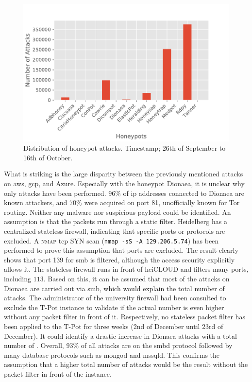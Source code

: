\begin{figure}
    \centering
    \includegraphics[width=\textwidth]{figures/tpot-overview-attacks.pdf}
    \caption[Distribution of honeypot attacks]{
        Distribution of honeypot attacks.
        Timestamp; 26th of September to 16th of October.
    }
    \label{fig:overview-attacks}
\end{figure}

What is striking is the large disparity between the previously mentioned attacks on \ac{aws}, \ac{gcp}, and Azure.
Especially with the honeypot Dionaea, it is unclear why only  attacks have been performed.
$96\%$ of \ac{ip} addresses connected to Dionaea are known attackers, and $70\%$ were acquired on port 81, unofficially known for Tor routing.
Neither any malware nor suspicious payload could be identified.
An assumption is that the packets run through a static filter.
Heidelberg has a centralized stateless firewall, indicating that specific ports or protocols are excluded.
A \textsc{nmap} \ac{tcp} SYN scan (\verb|nmap -sS -A 129.206.5.74|) has been performed to prove this assumption that ports are excluded.
The result clearly shows that port 139 for \ac{smb} is filtered, although the access security explicitly allows it.
The stateless firewall runs in front of heiCLOUD and filters many ports, including $113$.
Based on this, it can be assumed that most of the attacks on Dionaea are carried out via \ac{smb}, which would explain the total number of attacks.
The administrator of the university firewall had been consulted to exclude the T-Pot instance to validate if the actual number is even higher without any packet filter in front of it.
Respectively, no stateless packet filter has been applied to the T-Pot for three weeks (2nd of December until 23rd of December).
It could identify a drastic increase in Dionaea attacks with a total number of .
Overall, $93\%$ of all attacks are on the smbd protocol followed by many database protocols such as mongod and mssqld.
This confirms the assumption that a higher total number of attacks would be the result without the packet filter in front of the instance.

